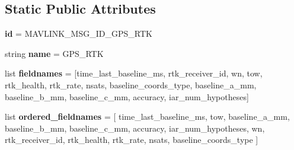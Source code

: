 \subsection*{Static Public Attributes}
\begin{DoxyCompactItemize}
\item 
\mbox{\label{classpymavlink_1_1dialects_1_1v10_1_1MAVLink__gps__rtk__message_ada3f2f9f112db2018b8260a2759c62af}} 
{\bfseries id} = M\+A\+V\+L\+I\+N\+K\+\_\+\+M\+S\+G\+\_\+\+I\+D\+\_\+\+G\+P\+S\+\_\+\+R\+TK
\item 
\mbox{\label{classpymavlink_1_1dialects_1_1v10_1_1MAVLink__gps__rtk__message_a0dd6354d41f37976276686e89f627f9d}} 
string {\bfseries name} = \textquotesingle{}G\+P\+S\+\_\+\+R\+TK\textquotesingle{}
\item 
\mbox{\label{classpymavlink_1_1dialects_1_1v10_1_1MAVLink__gps__rtk__message_a3fc30e187cd0b40efc35b917bb4987a1}} 
list {\bfseries fieldnames} = \mbox{[}\textquotesingle{}time\+\_\+last\+\_\+baseline\+\_\+ms\textquotesingle{}, \textquotesingle{}rtk\+\_\+receiver\+\_\+id\textquotesingle{}, \textquotesingle{}wn\textquotesingle{}, \textquotesingle{}tow\textquotesingle{}, \textquotesingle{}rtk\+\_\+health\textquotesingle{}, \textquotesingle{}rtk\+\_\+rate\textquotesingle{}, \textquotesingle{}nsats\textquotesingle{}, \textquotesingle{}baseline\+\_\+coords\+\_\+type\textquotesingle{}, \textquotesingle{}baseline\+\_\+a\+\_\+mm\textquotesingle{}, \textquotesingle{}baseline\+\_\+b\+\_\+mm\textquotesingle{}, \textquotesingle{}baseline\+\_\+c\+\_\+mm\textquotesingle{}, \textquotesingle{}accuracy\textquotesingle{}, \textquotesingle{}iar\+\_\+num\+\_\+hypotheses\textquotesingle{}\mbox{]}
\item 
\mbox{\label{classpymavlink_1_1dialects_1_1v10_1_1MAVLink__gps__rtk__message_aaf274c02fe42d042ea34b306eb5c8799}} 
list {\bfseries ordered\+\_\+fieldnames} = \mbox{[} \textquotesingle{}time\+\_\+last\+\_\+baseline\+\_\+ms\textquotesingle{}, \textquotesingle{}tow\textquotesingle{}, \textquotesingle{}baseline\+\_\+a\+\_\+mm\textquotesingle{}, \textquotesingle{}baseline\+\_\+b\+\_\+mm\textquotesingle{}, \textquotesingle{}baseline\+\_\+c\+\_\+mm\textquotesingle{}, \textquotesingle{}accuracy\textquotesingle{}, \textquotesingle{}iar\+\_\+num\+\_\+hypotheses\textquotesingle{}, \textquotesingle{}wn\textquotesingle{}, \textquotesingle{}rtk\+\_\+receiver\+\_\+id\textquotesingle{}, \textquotesingle{}rtk\+\_\+health\textquotesingle{}, \textquotesingle{}rtk\+\_\+rate\textquotesingle{}, \textquotesingle{}nsats\textquotesingle{}, \textquotesingle{}baseline\+\_\+coords\+\_\+type\textquotesingle{} \mbox{]}

\end{DoxyCompactItemize}
